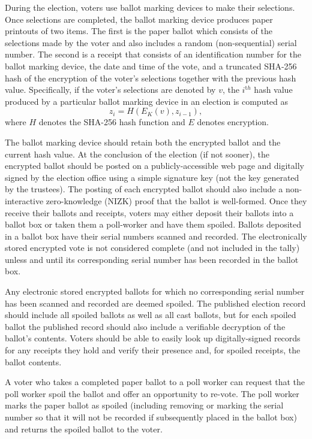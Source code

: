 During the election, voters use ballot marking devices to make their selections.  Once selections are completed, the ballot marking device produces paper printouts of two items.  The first is the paper ballot which consists of the selections made by the voter and also includes a random (non-sequential) serial number.  The second is a receipt that consists of an identification number for the ballot marking device, the date and time of the vote, and a truncated SHA-256 hash of the \elgamal encryption of the voter's selections together with the previous hash value.  Specifically, if the voter's selections are denoted by $v$, the $i^{\mathrm th}$ hash value produced by a particular ballot marking device in an election is computed as
\[
z_i=H(E_K(v),z_{i-1} ),
\]
\noindent
where $H$ denotes the SHA-256 hash function and $E$ denotes \elgamal encryption.

The ballot marking device should retain both the encrypted ballot and the current hash value.  At the conclusion of the election (if not sooner), the encrypted ballot should be posted on a publicly-accessible web page and digitally signed by the election office using a simple signature key (not the key generated by the trustees).  The posting of each encrypted ballot should also include a non-interactive zero-knowledge (NIZK) proof that the ballot is well-formed.
Once they receive their ballots and receipts, voters may either deposit their ballots into a ballot box or taken them a poll-worker and have them spoiled.  Ballots deposited in a ballot box have their serial numbers scanned and recorded.  The electronically stored encrypted vote is not considered complete (and not included in the tally) unless and until its corresponding serial number has been recorded in the ballot box.

Any electronic stored encrypted ballots for which no corresponding serial number has been scanned and recorded are deemed spoiled.  The published election record should include all spoiled ballots as well as all cast ballots, but for each spoiled ballot the published record should also include a verifiable decryption of the ballot's contents.  Voters should be able to easily look up digitally-signed records for any receipts they hold and verify their presence and, for spoiled receipts, the ballot contents.

A voter who takes a completed paper ballot to a poll worker can request that the poll worker spoil the ballot and offer an opportunity to re-vote.  The poll worker marks the paper ballot as spoiled (including removing or marking the serial number so that it will not be recorded if subsequently placed in the ballot box) and returns the spoiled ballot to the voter.

